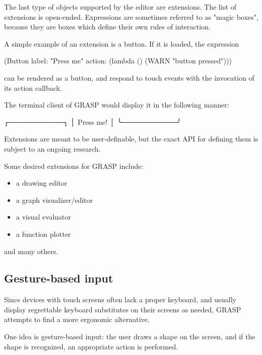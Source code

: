 \documentclass[sigconf]{acmart}
\newenvironment{Snippet}{\Verbatim[samepage=true]}{\endVerbatim}
\begin{document}
The last type of objects supported by the editor
are extensions. The list of extensions is open-ended.
Expressions are sometimes referred to as "magic boxes",
because they are boxes which define their own rules
of interaction.

A simple example of an extension is a button.
If it is loaded, the expression

\begin{Snippet}
(Button label: "Press me" 
	action: (lambda () (WARN "button pressed")))
\end{Snippet}

can be rendered as a button, and respond
to touch events with the invocation of its
action callback.

The terminal client of GRASP would display
it in the following manner:

\begin{Snippet}
╭───────────╮
│ Press me! │
╰───────────╯
\end{Snippet}

Extensions are meant to be user-definable, but
the exact API for defining them is subject to
an ongoing research.

Some desired extensions for GRASP include:
\begin{itemize}
\item a drawing editor
\item a graph visualizer/editor
\item a visual evaluator
\item a function plotter
\end{itemize}

and many others.

\subsection{Gesture-based input}

Since devices with touch screens often lack
a proper keyboard, and usually display regrettable
keyboard substitutes on their screens as needed,
GRASP attempts to find a more ergonomic alternative.

One idea is gesture-based input: the user draws
a shape on the screen, and if the shape is recognized,
an appropriate action is performed.
\end{document}
